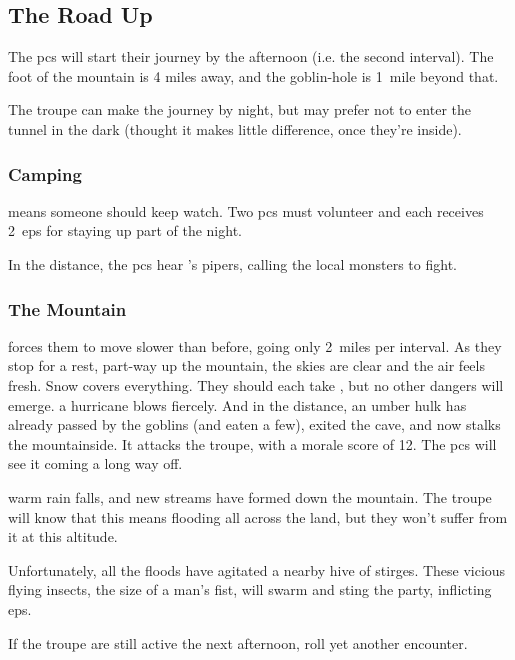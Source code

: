 \begin{multicols}{2}
\subsection{The Road Up}

The \glspl{pc} will start their \gls{journey} by the afternoon (i.e. the second \gls{interval}).
The foot of the mountain is 4 miles away, and the goblin-hole is 1~mile beyond that.

The troupe can make the journey by night, but may prefer not to enter the tunnel in the dark (thought it makes little difference, once they're inside).

\subsubsection{Camping}
means someone should keep watch.
Two \glspl{pc} must volunteer and each receives 2~\glspl{ep} for staying up part of the night.

In the distance, the \glspl{pc} hear 's pipers, calling the local \glspl{monster} to fight.

\subsubsection{The Mountain}
forces them to move slower than before, going only 2~miles per \gls{interval}.
As they stop for a rest, part-way up the mountain,
\ifcase\value{temperature}
  the skies are clear and the air feels fresh.
  Snow covers everything.
  They should each take , but no other dangers will emerge.
  \or
  a hurricane blows fiercely.
  And in the distance, an umber hulk has already passed by the goblins (and eaten a few), exited the cave, and now stalks the mountainside.
  It attacks the troupe, with a morale score of 12.
  The \glspl{pc} will see it coming a long way off.

  \umberhulk
  \else
  warm rain falls, and new streams have formed down the mountain.
  The troupe will know that this means flooding all across the land, but they won't suffer from it at this altitude.

  Unfortunately, all the floods have agitated a nearby hive of stirges.
  These vicious flying insects, the size of a man's fist, will swarm%
  and sting the party, inflicting \glspl{ep}.%

  \stirgeSwarm
\fi

If the troupe are still active the next afternoon, roll yet another encounter.%


\end{multicols}
